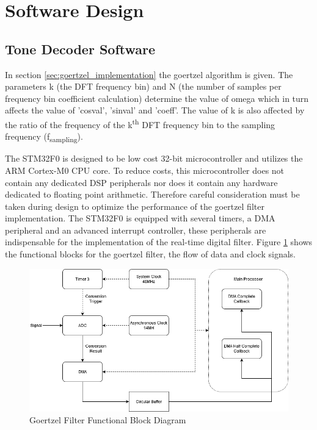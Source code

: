 \section{Software Design}

\subsection{Tone Decoder Software}
\label{tone_decoder_software}

In section \ref{sec:goertzel_implementation} the goertzel algorithm is given. The parameters k (the DFT frequency bin) and N (the number of samples per frequency bin coefficient calculation) determine the value of omega which in turn affects the value of 'cosval', 'sinval' and 'coeff'. The value of k is also affected by the ratio of the frequency of the k\textsuperscript{th} DFT frequency bin to the sampling frequency (f\textsubscript{sampling}).

The STM32F0 is designed to be low cost 32-bit microcontroller and utilizes the ARM Cortex-M0 CPU core. To reduce costs, this microcontroller does not contain any dedicated DSP peripherals nor does it contain any hardware dedicated to floating point arithmetic. Therefore careful consideration must be taken during design to optimize the performance of the goertzel filter implementation. The STM32F0 is equipped with several timers, a DMA peripheral and an advanced interrupt controller, these peripherals are indispensable for the implementation of the real-time digital filter. Figure \ref{fig:goertzel_functional_diagram} shows the functional blocks for the goertzel filter, the flow of data and clock signals.

\begin{figure}[H]
	\centering
	\includegraphics[width=.8\textwidth]{figures/design/goertzel_filter_functional.png}
	\caption{Goertzel Filter Functional Block Diagram}
	\label{fig:goertzel_functional_diagram}
\end{figure}

